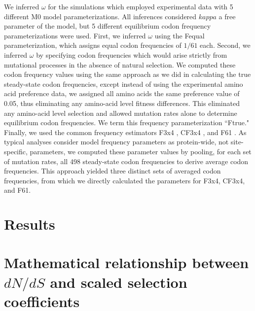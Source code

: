 \documentclass[11pt]{article}
\begin{document}
We inferred $\omega$ for the simulations which employed experimental data with 5 different M0 model parameterizations. All inferences considered $kappa$ a free parameter of the model, but 5 different equilibrium codon frequency parameterizations were used. First, we inferred $\omega$ using the Fequal \cite{Yang2006} parameterization, which assigns equal codon frequencies of $1/61$ each. Second, we inferred $\omega$ by specifying codon frequencies which would arise strictly from mutational processes in the absence of natural selection. We computed these codon frequency values using the same approach as we did in calculating the true steady-state codon frequencies, except instead of using the experimental amino acid preference data, we assigned all amino acids the same preference value of 0.05, thus eliminating any amino-acid level fitness differences. This eliminated any amino-acid level selection and allowed mutation rates alone to determine equilibrium codon frequencies. We term this frequency parameterization ``Ftrue." Finally, we used the common frequency estimators F3x4 \cite{MuseGaut1994}, CF3x4 \cite{Pond2010}, and F61 \cite{GoldmanYang1994}. As typical analyses consider model frequency parameters as protein-wide, not site-specific, parameters, we computed these parameter values by pooling, for each set of mutation rates, all 498 steady-state codon frequencies to derive average codon frequencies. This approach yielded three distinct sets of averaged codon frequencies, from which we directly calculated the parameters for F3x4, CF3x4, and F61.








\section*{Results}


\section*{Mathematical relationship between $dN/dS$ and scaled selection coefficients}
\end{document}
